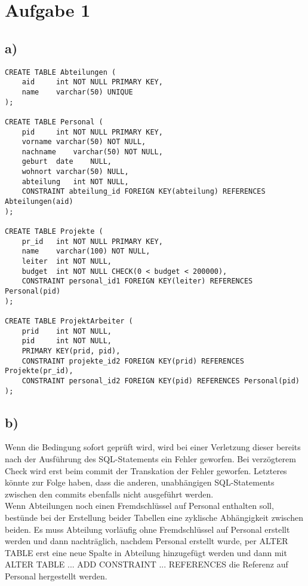 \documentclass[a4paper,10pt,]{scrartcl}
\begin{document}
\section*{Aufgabe 1}
\subsection*{a)}
\begin{verbatim}
CREATE TABLE Abteilungen (
    aid     int NOT NULL PRIMARY KEY,
    name    varchar(50) UNIQUE
);

CREATE TABLE Personal (
    pid     int NOT NULL PRIMARY KEY,
    vorname varchar(50) NOT NULL,
    nachname    varchar(50) NOT NULL,
    geburt  date    NULL,
    wohnort varchar(50) NULL,
    abteilung   int NOT NULL,
    CONSTRAINT abteilung_id FOREIGN KEY(abteilung) REFERENCES Abteilungen(aid)
);

CREATE TABLE Projekte (
    pr_id   int NOT NULL PRIMARY KEY,
    name    varchar(100) NOT NULL,
    leiter  int NOT NULL,
    budget  int NOT NULL CHECK(0 < budget < 200000),
    CONSTRAINT personal_id1 FOREIGN KEY(leiter) REFERENCES Personal(pid)
);

CREATE TABLE ProjektArbeiter (
    prid    int NOT NULL,
    pid     int NOT NULL,
    PRIMARY KEY(prid, pid),
    CONSTRAINT projekte_id2 FOREIGN KEY(prid) REFERENCES Projekte(pr_id),
    CONSTRAINT personal_id2 FOREIGN KEY(pid) REFERENCES Personal(pid)
);

\end{verbatim}

\newpage
\subsection*{b)}
Wenn die Bedingung sofort geprüft wird, wird bei einer Verletzung dieser
bereits nach der Ausführung des SQL-Statements ein Fehler geworfen. Bei
verzögterem Check wird erst beim commit der Transkation der Fehler geworfen.
Letzteres könnte zur Folge haben, dass die anderen, unabhängigen
SQL-Statements zwischen den commits ebenfalls nicht ausgeführt werden.\\
Wenn Abteilungen noch einen Fremdschlüssel auf Personal enthalten soll,
bestünde bei der Erstellung beider Tabellen eine zyklische Abhängigkeit zwischen beiden.
Es muss Abteilung vorläufig ohne Fremdschlüssel auf Personal erstellt werden
und dann nachträglich, nachdem Personal erstellt wurde, per ALTER TABLE erst
eine neue Spalte in Abteilung hinzugefügt werden und dann mit ALTER
TABLE ... ADD CONSTRAINT ... REFERENCES die Referenz auf Personal hergestellt
werden.
\end{document}
